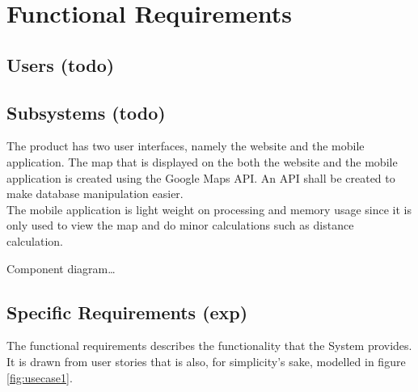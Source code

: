 \documentclass{article}
\begin{document}
    \newpage


    \section{Functional Requirements} 

    \subsection{Users (todo)}

    \subsection{Subsystems (todo)}

    The product has two user interfaces, namely the website and the mobile
    application. The map that is displayed on the both the website and the
    mobile application is created using the Google Maps API. An API shall be
    created to make database manipulation easier.\\ The mobile application is
    light weight on processing and memory usage since it is only used to view
    the map and do minor calculations such as distance calculation.

    Component diagram\ldots

    \subsection{Specific Requirements (exp)}

    The functional requirements describes the functionality that the System
    provides. It is drawn from user stories that is also, for simplicity's
    sake, modelled in figure \ref{fig:usecase1}.
\end{document}
